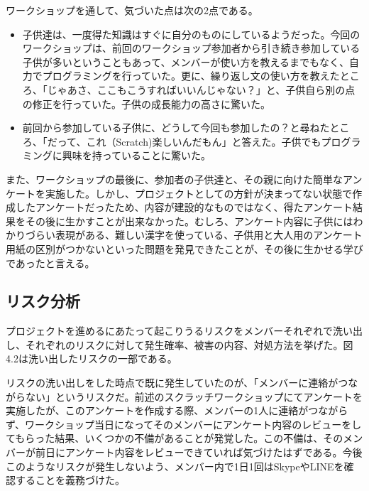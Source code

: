 \documentclass[openany,11pt,papersize]{jsbook}
\begin{document}
\par ワークショップを通して、気づいた点は次の2点である。
\begin{itemize}
\item 子供達は、一度得た知識はすぐに自分のものにしているようだった。今回のワークショップは、前回のワークショップ参加者から引き続き参加している子供が多いということもあって、メンバーが使い方を教えるまでもなく、自力でプログラミングを行っていた。更に、繰り返し文の使い方を教えたところ、「じゃあさ、ここもこうすればいいんじゃない？」と、子供自ら別の点の修正を行っていた。子供の成長能力の高さに驚いた。
\item 前回から参加している子供に、どうして今回も参加したの？と尋ねたところ、「だって、これ（Scratch)楽しいんだもん」と答えた。子供でもプログラミングに興味を持っていることに驚いた。
\end{itemize}

\par また、ワークショップの最後に、参加者の子供達と、その親に向けた簡単なアンケートを実施した。しかし、プロジェクトとしての方針が決まってない状態で作成したアンケートだったため、内容が建設的なものではなく、得たアンケート結果をその後に生かすことが出来なかった。むしろ、アンケート内容に子供にはわかりづらい表現がある、難しい漢字を使っている、子供用と大人用のアンケート用紙の区別がつかないといった問題を発見できたことが、その後に生かせる学びであったと言える。


\subsection{リスク分析}
\par プロジェクトを進めるにあたって起こりうるリスクをメンバーそれぞれで洗い出し、それぞれのリスクに対して発生確率、被害の内容、対処方法を挙げた。図4.2は洗い出したリスクの一部である。

\par リスクの洗い出しをした時点で既に発生していたのが、「メンバーに連絡がつながらない」というリスクだ。前述のスクラッチワークショップにてアンケートを実施したが、このアンケートを作成する際、メンバーの1人に連絡がつながらず、ワークショップ当日になってそのメンバーにアンケート内容のレビューをしてもらった結果、いくつかの不備があることが発覚した。この不備は、そのメンバーが前日にアンケート内容をレビューできていれば気づけたはずである。今後このようなリスクが発生しないよう、メンバー内で1日1回はSkypeやLINEを確認することを義務づけた。
\end{document}
